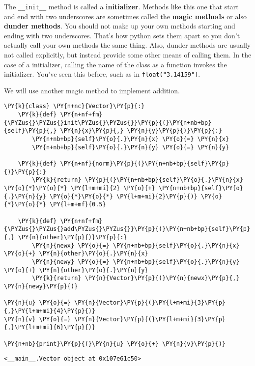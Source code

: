 The \texttt{\_\_init\_\_} method is called a \textbf{initializer}.  Methods like this one that start and end with two underscores are sometimes called the \textbf{magic methods} or also \textbf{dunder methods}.  You should not make up your own methods starting and ending with two underscores.  That's how python sets them apart so you don't actually call your own methods the same thing.  Also, dunder methods are usually not called explicitly, but instead provide some other means of calling them.  In the case of a initializer, calling the name of the class as a function invokes the initializer.  You've seen this before, such as in \texttt{float("3.14159")}.


We will use another magic method to implement addition.


\begin{Verbatim}[commandchars=\\\{\}]
\PY{k}{class} \PY{n+nc}{Vector}\PY{p}{:}
    \PY{k}{def} \PY{n+nf+fm}{\PYZus{}\PYZus{}init\PYZus{}\PYZus{}}\PY{p}{(}\PY{n+nb+bp}{self}\PY{p}{,} \PY{n}{x}\PY{p}{,} \PY{n}{y}\PY{p}{)}\PY{p}{:}
        \PY{n+nb+bp}{self}\PY{o}{.}\PY{n}{x} \PY{o}{=} \PY{n}{x}
        \PY{n+nb+bp}{self}\PY{o}{.}\PY{n}{y} \PY{o}{=} \PY{n}{y}

    \PY{k}{def} \PY{n+nf}{norm}\PY{p}{(}\PY{n+nb+bp}{self}\PY{p}{)}\PY{p}{:}
        \PY{k}{return} \PY{p}{(}\PY{n+nb+bp}{self}\PY{o}{.}\PY{n}{x} \PY{o}{*}\PY{o}{*} \PY{l+m+mi}{2} \PY{o}{+} \PY{n+nb+bp}{self}\PY{o}{.}\PY{n}{y} \PY{o}{*}\PY{o}{*} \PY{l+m+mi}{2}\PY{p}{)} \PY{o}{*}\PY{o}{*} \PY{l+m+mf}{0.5}

    \PY{k}{def} \PY{n+nf+fm}{\PYZus{}\PYZus{}add\PYZus{}\PYZus{}}\PY{p}{(}\PY{n+nb+bp}{self}\PY{p}{,} \PY{n}{other}\PY{p}{)}\PY{p}{:}
        \PY{n}{newx} \PY{o}{=} \PY{n+nb+bp}{self}\PY{o}{.}\PY{n}{x} \PY{o}{+} \PY{n}{other}\PY{o}{.}\PY{n}{x}
        \PY{n}{newy} \PY{o}{=} \PY{n+nb+bp}{self}\PY{o}{.}\PY{n}{y} \PY{o}{+} \PY{n}{other}\PY{o}{.}\PY{n}{y}
        \PY{k}{return} \PY{n}{Vector}\PY{p}{(}\PY{n}{newx}\PY{p}{,} \PY{n}{newy}\PY{p}{)}

\PY{n}{u} \PY{o}{=} \PY{n}{Vector}\PY{p}{(}\PY{l+m+mi}{3}\PY{p}{,}\PY{l+m+mi}{4}\PY{p}{)}
\PY{n}{v} \PY{o}{=} \PY{n}{Vector}\PY{p}{(}\PY{l+m+mi}{3}\PY{p}{,}\PY{l+m+mi}{6}\PY{p}{)}

\PY{n+nb}{print}\PY{p}{(}\PY{n}{u} \PY{o}{+} \PY{n}{v}\PY{p}{)}
\end{Verbatim}

\begin{Verbatim}
<__main__.Vector object at 0x107e61c50>
\end{Verbatim}


